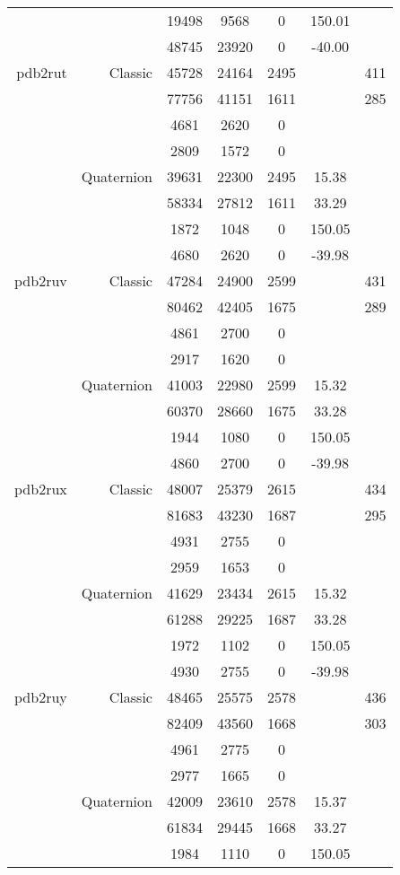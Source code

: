 \begin{xltabular}{\textwidth}{r|rcccSc}
& & 19498 & 9568 & 0 & 150.01 & \\
& & 48745 & 23920 & 0 & -40.00 & \\ \addlinespace
pdb2rut & Classic & 45728 & 24164 & 2495 & & 411 \\
& & 77756 & 41151 & 1611 & & 285 \\
& & 4681 & 2620 & 0 & & \\
& & 2809 & 1572 & 0 & & \\
& Quaternion & 39631 & 22300 & 2495 & 15.38 & \\
& & 58334 & 27812 & 1611 & 33.29 & \\
& & 1872 & 1048 & 0 & 150.05 & \\
& & 4680 & 2620 & 0 & -39.98 & \\ \addlinespace
pdb2ruv & Classic & 47284 & 24900 & 2599 & & 431 \\
& & 80462 & 42405 & 1675 & & 289 \\
& & 4861 & 2700 & 0 & & \\
& & 2917 & 1620 & 0 & & \\
& Quaternion & 41003 & 22980 & 2599 & 15.32 & \\
& & 60370 & 28660 & 1675 & 33.28 & \\
& & 1944 & 1080 & 0 & 150.05 & \\
& & 4860 & 2700 & 0 & -39.98 & \\ \addlinespace
pdb2rux & Classic & 48007 & 25379 & 2615 & & 434 \\
& & 81683 & 43230 & 1687 & & 295 \\
& & 4931 & 2755 & 0 & & \\
& & 2959 & 1653 & 0 & & \\
& Quaternion & 41629 & 23434 & 2615 & 15.32 & \\
& & 61288 & 29225 & 1687 & 33.28 & \\
& & 1972 & 1102 & 0 & 150.05 & \\
& & 4930 & 2755 & 0 & -39.98 & \\ \addlinespace
pdb2ruy & Classic & 48465 & 25575 & 2578 & & 436 \\
& & 82409 & 43560 & 1668 & & 303 \\
& & 4961 & 2775 & 0 & & \\
& & 2977 & 1665 & 0 & & \\
& Quaternion & 42009 & 23610 & 2578 & 15.37 & \\
& & 61834 & 29445 & 1668 & 33.27 & \\
& & 1984 & 1110 & 0 & 150.05 & \\

\end{xltabular}
